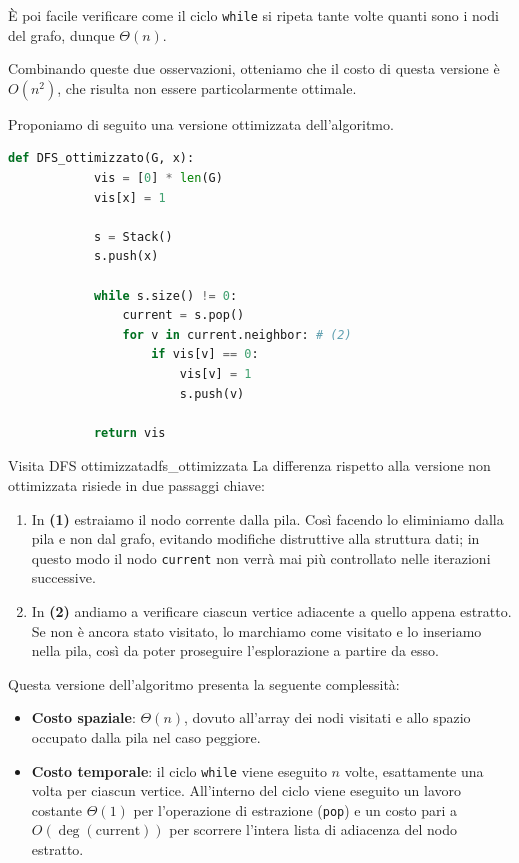 \documentclass[12pt]{report}
\begin{document}
	È poi facile verificare come il ciclo \texttt{while} si ripeta tante volte quanti sono i nodi del grafo, dunque $\Theta(n)$.
	
	Combinando queste due osservazioni, otteniamo che il costo di questa versione è $O(n^2)$, che risulta non essere particolarmente ottimale.
	
	\smallbreak
	Proponiamo di seguito una versione ottimizzata dell'algoritmo.	
	\begin{lstlisting}[style=stile-listings, language=Python]
		def DFS_ottimizzato(G, x):
			vis = [0] * len(G)
			vis[x] = 1
			
			s = Stack()
			s.push(x)
			
			while s.size() != 0:
				current = s.pop()
				for v in current.neighbor: # (2)
					if vis[v] == 0:
						vis[v] = 1
						s.push(v)
			
			return vis
	\end{lstlisting}
	
	\begin{algoritmo}{Visita DFS ottimizzata}{dfs_ottimizzata}
		La differenza rispetto alla versione non ottimizzata risiede in due passaggi chiave:
		\begin{enumerate}
			\item In \textbf{(1)} estraiamo il nodo corrente dalla pila. Così facendo lo eliminiamo dalla pila e non dal grafo, evitando modifiche distruttive alla struttura dati; in questo modo il nodo \texttt{current} non verrà mai più controllato nelle iterazioni successive.
			\item In \textbf{(2)} andiamo a verificare ciascun vertice adiacente a quello appena estratto. Se non è ancora stato visitato, lo marchiamo come visitato e lo inseriamo nella pila, così da poter proseguire l'esplorazione a partire da esso.
		\end{enumerate}
	\end{algoritmo}
	
	Questa versione dell'algoritmo presenta la seguente complessità:
	\begin{itemize}
		\item \textbf{Costo spaziale}: $\Theta(n)$, dovuto all'array dei nodi visitati e allo spazio occupato dalla pila nel caso peggiore.
		\item \textbf{Costo temporale}: il ciclo \texttt{while} viene eseguito $n$ volte, esattamente una volta per ciascun vertice. All'interno del ciclo viene eseguito un lavoro costante $\Theta(1)$ per l'operazione di estrazione (\texttt{pop}) e un costo pari a $O(\operatorname{deg}(\text{current}))$ per scorrere l'intera lista di adiacenza del nodo estratto.
	\end{itemize}
	
\end{document}
